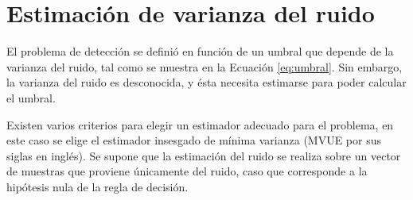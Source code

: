 \color{black}

\section{Estimación de varianza del ruido}
\label{S:estimacion-ruido}

El problema de detección se definió en función de un umbral que depende de la varianza del ruido, tal como se muestra en la Ecuación \ref{eq:umbral}. Sin embargo, la varianza del ruido es desconocida, y ésta necesita estimarse para poder calcular el umbral. 

Existen varios criterios para elegir un estimador adecuado para el problema, en este caso se elige el estimador insesgado de mínima varianza (MVUE por sus siglas en inglés). Se supone que la estimación del ruido se realiza sobre un vector de muestras que proviene únicamente del ruido, caso que corresponde a la hipótesis nula de la regla de decisión.

